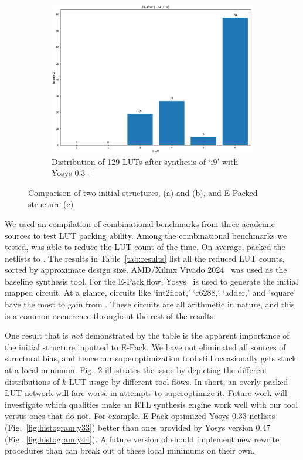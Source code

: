 \begin{figure}
    \begin{subfigure}{0.47\textwidth}
        \centering
        \includegraphics[width=\textwidth]{img/epack.png}
        \caption{Distribution of 129 LUTs after synthesis of `i9' with Yosys 0.3 + \shortname{}}\label{fig:histogram:epack}
    \end{subfigure}
    \caption{Comparison of two initial structures, (a) and (b), and E-Packed structure (c) }\label{fig:histogram}
\end{figure}

We used an compilation of \nbenchmarks{} combinational benchmarks from three
academic sources to test LUT packing ability. Among the combinational
benchmarks we tested, \shortname{} was able to reduce the LUT count \fmetric{}
of the time. On average, \shortname{} packed the netlists to \metric{}. The
results in Table~\ref{tab:results} list all the reduced LUT counts, sorted by
approximate design size. AMD/Xilinx Vivado 2024~\cite{vivado} was used as the
baseline synthesis tool. For the E-Pack flow, Yosys~\cite{yosys} is used to
generate the initial mapped circuit. At a glance, circuits like `int2float,'
`c6288,` `adder,' and `square' have the most to gain from \shortname{}. These
circuits are all arithmetic in nature, and this is a common occurrence
throughout the rest of the results.

One result that is \textit{not} demonstrated by the table is the apparent
importance of the initial structure inputted to E-Pack. We have not eliminated
all sources of structural bias, and hence our superoptimization tool still
occasionally gets stuck at a local minimum. Fig.~\ref{fig:histogram}
illustrates the issue by depicting the different distributions of $k$-LUT usage
by different tool flows. In short, an overly packed LUT network will fare worse
in attempts to superoptimize it. Future work will investigate which qualities
make an RTL synthesis engine work well with our tool versus ones that do not.
For example, E-Pack optimized Yosys 0.33 netlists
(Fig.~\ref{fig:histogram:y33}) better than ones provided by Yosys version 0.47
(Fig.~\ref{fig:histogram:y44}). A future version of \shortname{} should
implement new rewrite procedures than can break out of these local minimums on
their own.

